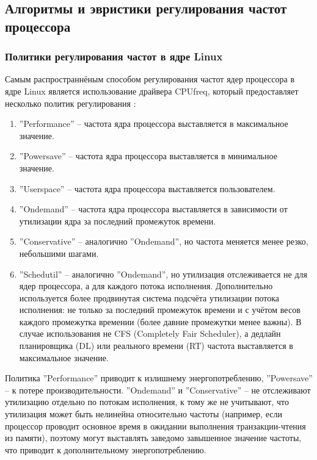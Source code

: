 \subsection{Алгоритмы и эвристики регулирования частот процессора}

\subsubsection{Политики регулирования частот в ядре Linux}

    Самым распространнёным способом регулирования частот ядер процессора в ядре Linux является
    использование драйвера CPUfreq, который предоставляет несколько политик
    регулирования \cite{KernelCPUfreq}:
    \begin{enumerate}
        \item ''Performance'' -- частота ядра процессора выставляется в максимальное значение.
        \item ''Powersave'' -- частота ядра процессора выставляется в минимальное значение.
        \item ''Userspace'' -- частота ядра процессора выставляется пользователем.
        \item ''Ondemand'' -- частота ядра процессора выставляется в зависимости от утилизации ядра
            за последний промежуток времени.
        \item ''Conservative'' -- аналогично ''Ondemand'', но частота меняется менее резко, небольшими
            шагами.
        \item ''Schedutil'' \cite{KernelDocsSchedutil} -- аналогично ''Ondemand'', но утилизация отслеживается
            не для ядер процессора, а для каждого потока исполнения.
            Дополнительно используется более продвинутая система подсчёта
            утилизации потока исполнения: не только за последний промежуток времени и с учётом весов
            каждого промежутка времении (более давние промежутки менее важны). В случае использования
            не CFS (Completely Fair Scheduler), а дедлайн планировщика (DL) или реального времени (RT)
            частота выставляется в максимальное значение.
    \end{enumerate}

    Политика ''Performance'' приводит к излишнему энергопотреблению, ''Powersave'' -- к потере
    производительности. ''Ondemand'' и ''Conservative'' -- не отслеживают утилизацию отдельно по
    потокам исполнения, к тому же не учитывают, что утилизация может быть нелинейна относительно частоты
    (например, если процессор проводит основное время в ожидании выполнения транзакции-чтения из памяти),
    поэтому могут выставлять заведомо завышенное значение частоты, что приводит к дополнительному
    энергопотреблению.

